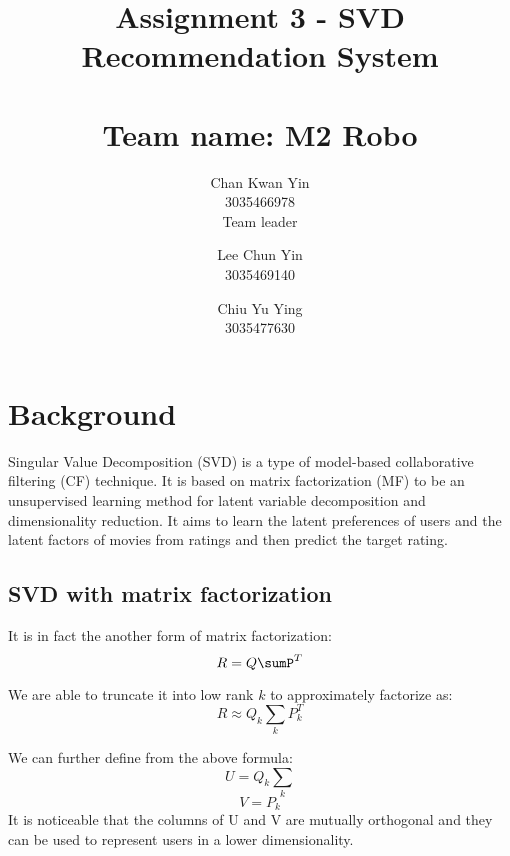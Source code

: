 \documentclass[final]{cvpr}
\begin{document}
\title{
	Assignment 3 - SVD Recommendation System \\~\\
	\large{Team name: M2 Robo}
}

\author{
	Chan Kwan Yin\\
	3035466978 \\
	Team leader

	\and

	Lee Chun Yin\\
	3035469140\\

	\and

	Chiu Yu Ying\\
	3035477630
}

\maketitle

\clearpage

\section{Background}

Singular Value Decomposition (SVD) is a type of model-based collaborative filtering (CF) technique. It is based on matrix factorization (MF) to be an unsupervised learning method for latent variable decomposition and dimensionality reduction.
It aims to learn the latent preferences of users and the latent factors of movies from ratings and then predict the target rating. 

\subsection{SVD with matrix factorization}

It is in fact the another form of matrix factorization:
$$R = Q\sumP^{T}$$

We are able to truncate it into low rank $k$ to approximately factorize as:
$$R \approx Q_k \sum_k P_k^T$$

We can further define from the above formula:
$$U = Q_k \sum_k$$
$$V = P_k$$
It is noticeable that the columns of U and V are mutually orthogonal and they can be used to represent users in a lower dimensionality.
\end{document}

